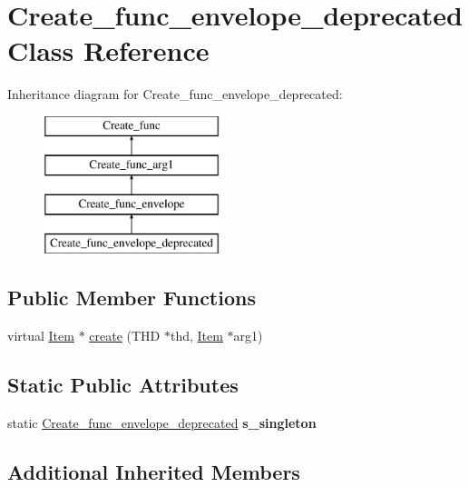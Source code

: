 \hypertarget{classCreate__func__envelope__deprecated}{}\section{Create\+\_\+func\+\_\+envelope\+\_\+deprecated Class Reference}
\label{classCreate__func__envelope__deprecated}
Inheritance diagram for Create\+\_\+func\+\_\+envelope\+\_\+deprecated\+:\begin{figure}[H]
\begin{center}
\leavevmode
\includegraphics[height=4.000000cm]{classCreate__func__envelope__deprecated}
\end{center}
\end{figure}
\subsection*{Public Member Functions}
\begin{DoxyCompactItemize}
\item 
virtual \mbox{\hyperlink{classItem}{Item}} $\ast$ \mbox{\hyperlink{classCreate__func__envelope__deprecated_ad9485348b65fe2ecd722cf2810fa0e9c}{create}} (T\+HD $\ast$thd, \mbox{\hyperlink{classItem}{Item}} $\ast$arg1)
\end{DoxyCompactItemize}
\subsection*{Static Public Attributes}
\begin{DoxyCompactItemize}
\item 
\mbox{\label{classCreate__func__envelope__deprecated_af6dd748341082f86c9853c5924561f62}} 
static \mbox{\hyperlink{classCreate__func__envelope__deprecated}{Create\+\_\+func\+\_\+envelope\+\_\+deprecated}} {\bfseries s\+\_\+singleton}
\end{DoxyCompactItemize}
\subsection*{Additional Inherited Members}


